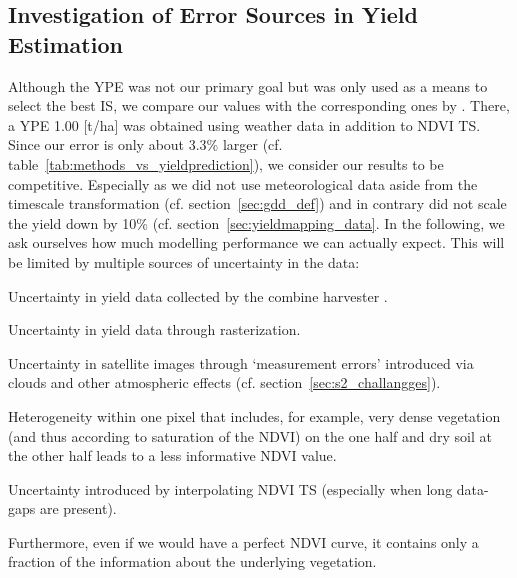 {    \subsection{Investigation of Error Sources in Yield Estimation}{\label{sec:discuss_high-rmse-in-yield-prdiction}
        Although the YPE was not our primary goal but was only used as a means to select the best IS, we compare our values with the corresponding ones by \cite{perichPixelbasedCropYield2022}. There, a YPE 1.00 [t/ha] was obtained using weather data in addition to NDVI TS. Since our error is only about 3.3\% larger (cf. table~\ref{tab:methods_vs_yieldprediction}), we consider our results to be competitive. Especially as we did not use meteorological data aside from the timescale transformation (cf. section~\ref{sec:gdd_def}) and in contrary did not scale the yield down by 10\% (cf. section~\ref{sec:yieldmapping_data}. In the following, we ask ourselves how much modelling performance we can actually expect. This will be limited by multiple sources of uncertainty in the data:
        \begin{Nenumerate}
            \item Uncertainty in yield data collected by the combine harvester \citep{robinsonComparingPerformanceTechniques2005}.
            \item Uncertainty in yield data through rasterization.
            \item Uncertainty in satellite images through `measurement errors' introduced via clouds and other atmospheric effects (cf. section~\ref{sec:s2_challangges}).
            \item Heterogeneity within one pixel that includes, for example, very dense vegetation (and thus according to \cite{guNDVISaturationAdjustment2013} saturation of the NDVI) on the one half and dry soil at the other half leads to a less informative NDVI value.
            \item Uncertainty introduced by interpolating NDVI TS (especially when long data-gaps are present).
        \end{Nenumerate}
        Furthermore, even if we would have a perfect NDVI curve, it contains only a fraction of the information about the underlying vegetation. 
}}

